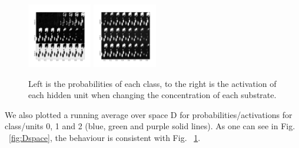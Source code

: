 \documentclass{article}
\begin{document}
\begin{figure}[H]
	\centering
	\includegraphics[width=0.25\textwidth]{DNN_prop_im.png} \hspace*{-.5cm}
	\includegraphics[width=0.25\textwidth]{DNN_sigmoid_im.png}
	\caption{Left is the probabilities of each class, to the right is the activation of each hidden unit when changing the concentration of each substrate.}
	\label{fig:activations}
\end{figure}
%
We also plotted a running average over space D for probabilities/activations for class/units 0, 1 and 2 (blue, green and purple solid lines).
As one can see in Fig. ~\ref{fig:Dspace}, the behaviour is consistent with Fig. ~\ref{fig:activations}.
%
\end{document}
